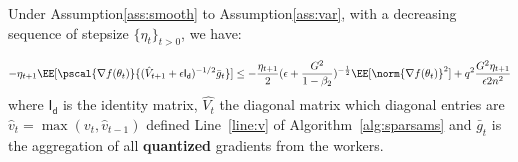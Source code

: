 \documentclass[11pt]{article}
\begin{document}
\begin{Lemma}\label{lem:lemma1}
Under Assumption\ref{ass:smooth} to Assumption\ref{ass:var}, with a decreasing sequence of stepsize $\{\eta_t\}_{t>0}$, we have:

\begin{equation}
-\eta_{t+1}\EE[\pscal{\nabla f(\theta_t)}{(\hat{V}_{t+1} + \epsilon \mathsf{I_d})^{-1/2} \bar{g}_t}] \leq - \frac{\eta_{t+1}}{2}  (\epsilon + \frac{G^2}{1 - \beta_2})^{-\frac{1}{2}} \EE[\norm{\nabla f(\theta_t)}^2] +q^2 \frac{G^2 \eta_{t+1}}{\epsilon 2n^2}
\end{equation}
where $ \mathsf{I_d}$ is the identity matrix, $\hat{V_t}$ the diagonal matrix which diagonal entries are $\hat v_t=\max(v_t,\hat v_{t-1})$ defined Line~\ref{line:v} of Algorithm~\ref{alg:sparsams} and $\bar{g}_t$ is the aggregation of all \textbf{quantized} gradients from the workers.
\end{Lemma}
\end{document}
